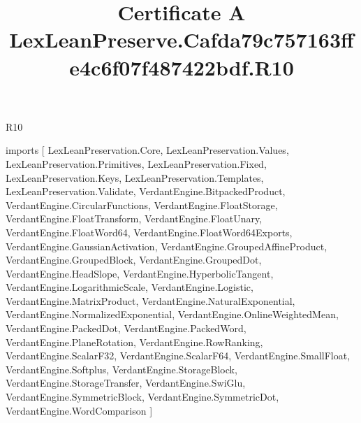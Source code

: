 \begin{lexlean}{R10}
\title{Certificate A LexLeanPreserve.Cafda79c757163ffe4c6f07f487422bdf.R10}
\begin{coremodule}
imports [
  LexLeanPreservation.Core,
  LexLeanPreservation.Values,
  LexLeanPreservation.Primitives,
  LexLeanPreservation.Fixed,
  LexLeanPreservation.Keys,
  LexLeanPreservation.Templates,
  LexLeanPreservation.Validate,
  VerdantEngine.BitpackedProduct,
  VerdantEngine.CircularFunctions,
  VerdantEngine.FloatStorage,
  VerdantEngine.FloatTransform,
  VerdantEngine.FloatUnary,
  VerdantEngine.FloatWord64,
  VerdantEngine.FloatWord64Exports,
  VerdantEngine.GaussianActivation,
  VerdantEngine.GroupedAffineProduct,
  VerdantEngine.GroupedBlock,
  VerdantEngine.GroupedDot,
  VerdantEngine.HeadSlope,
  VerdantEngine.HyperbolicTangent,
  VerdantEngine.LogarithmicScale,
  VerdantEngine.Logistic,
  VerdantEngine.MatrixProduct,
  VerdantEngine.NaturalExponential,
  VerdantEngine.NormalizedExponential,
  VerdantEngine.OnlineWeightedMean,
  VerdantEngine.PackedDot,
  VerdantEngine.PackedWord,
  VerdantEngine.PlaneRotation,
  VerdantEngine.RowRanking,
  VerdantEngine.ScalarF32,
  VerdantEngine.ScalarF64,
  VerdantEngine.SmallFloat,
  VerdantEngine.Softplus,
  VerdantEngine.StorageBlock,
  VerdantEngine.StorageTransfer,
  VerdantEngine.SwiGlu,
  VerdantEngine.SymmetricBlock,
  VerdantEngine.SymmetricDot,
  VerdantEngine.WordComparison
]


\end{coremodule}
\end{lexlean}
